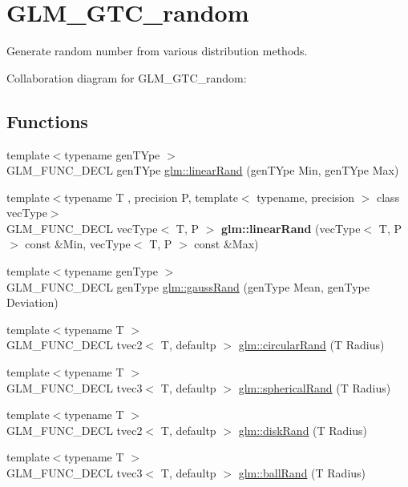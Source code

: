 \hypertarget{group__gtc__random}{\section{G\-L\-M\-\_\-\-G\-T\-C\-\_\-random}
\label{group__gtc__random}
}


Generate random number from various distribution methods.  


Collaboration diagram for G\-L\-M\-\_\-\-G\-T\-C\-\_\-random\-:
\subsection*{Functions}
\begin{DoxyCompactItemize}
\item 
{\footnotesize template$<$typename gen\-T\-Ype $>$ }\\G\-L\-M\-\_\-\-F\-U\-N\-C\-\_\-\-D\-E\-C\-L gen\-T\-Ype \hyperlink{group__gtc__random_ga12aebc19b85a8c736f5801c2f7b9b716}{glm\-::linear\-Rand} (gen\-T\-Ype Min, gen\-T\-Ype Max)
\item 
\hypertarget{group__gtc__random_gaba9cec867916d894d794a32897b7fdfd}{{\footnotesize template$<$typename T , precision P, template$<$ typename, precision $>$ class vec\-Type$>$ }\\G\-L\-M\-\_\-\-F\-U\-N\-C\-\_\-\-D\-E\-C\-L vec\-Type$<$ T, P $>$ {\bfseries glm\-::linear\-Rand} (vec\-Type$<$ T, P $>$ const \&Min, vec\-Type$<$ T, P $>$ const \&Max)}\label{group__gtc__random_gaba9cec867916d894d794a32897b7fdfd}

\item 
{\footnotesize template$<$typename gen\-Type $>$ }\\G\-L\-M\-\_\-\-F\-U\-N\-C\-\_\-\-D\-E\-C\-L gen\-Type \hyperlink{group__gtc__random_ga5193a83e49e4fdc5652c084711083574}{glm\-::gauss\-Rand} (gen\-Type Mean, gen\-Type Deviation)
\item 
{\footnotesize template$<$typename T $>$ }\\G\-L\-M\-\_\-\-F\-U\-N\-C\-\_\-\-D\-E\-C\-L tvec2$<$ T, defaultp $>$ \hyperlink{group__gtc__random_gae989c26a2899b2fb7444abe7c275c29c}{glm\-::circular\-Rand} (T Radius)
\item 
{\footnotesize template$<$typename T $>$ }\\G\-L\-M\-\_\-\-F\-U\-N\-C\-\_\-\-D\-E\-C\-L tvec3$<$ T, defaultp $>$ \hyperlink{group__gtc__random_gaa9a6fc2d7a295b3857f7db23b1053d9d}{glm\-::spherical\-Rand} (T Radius)
\item 
{\footnotesize template$<$typename T $>$ }\\G\-L\-M\-\_\-\-F\-U\-N\-C\-\_\-\-D\-E\-C\-L tvec2$<$ T, defaultp $>$ \hyperlink{group__gtc__random_gad3a3ee7d26502a31ba552cb627a68606}{glm\-::disk\-Rand} (T Radius)
\item 
{\footnotesize template$<$typename T $>$ }\\G\-L\-M\-\_\-\-F\-U\-N\-C\-\_\-\-D\-E\-C\-L tvec3$<$ T, defaultp $>$ \hyperlink{group__gtc__random_ga5506dee301160e3a06aef9b9bc7a0a83}{glm\-::ball\-Rand} (T Radius)
\end{DoxyCompactItemize}


